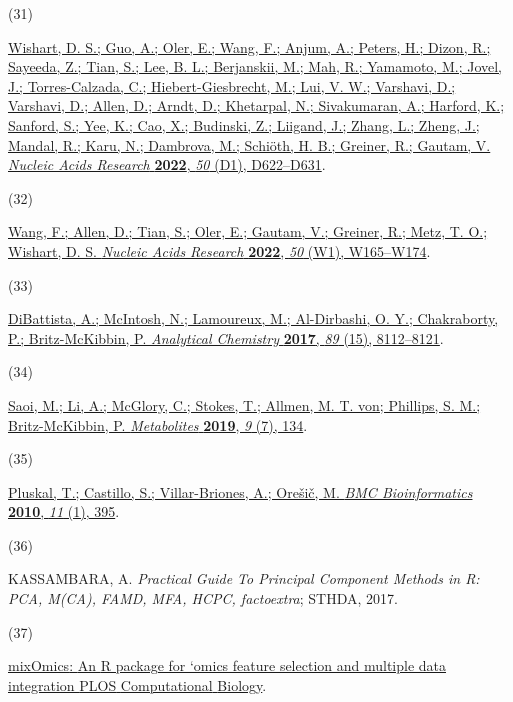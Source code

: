 \documentclass[journal=jacsat,manuscript=article]{achemso}
\newlength{\cslhangindent}
\newlength{\csllabelwidth}
\newenvironment{CSLReferences}[2] %
 {\begin{list}{}{%
  \setlength{\itemindent}{0pt}
  \setlength{\leftmargin}{0pt}
  \setlength{\parsep}{0pt}
  \ifodd #1
   \setlength{\leftmargin}{\cslhangindent}
   \setlength{\itemindent}{-1\cslhangindent}
  \fi
  \setlength{\itemsep}{#2\baselineskip}}}
 {\end{list}}
\newcommand{\CSLLeftMargin}[1]{\parbox[t]{\csllabelwidth}{#1}}
\newcommand{\CSLRightInline}[1]{\parbox[t]{\linewidth - \csllabelwidth}{#1}\break}
\begin{document}
\begin{CSLReferences}{0}{0}
\CSLLeftMargin{(31) }%
\CSLRightInline{\href{https://doi.org/10.1093/nar/gkab1062}{Wishart, D.
S.; Guo, A.; Oler, E.; Wang, F.; Anjum, A.; Peters, H.; Dizon, R.;
Sayeeda, Z.; Tian, S.; Lee, B. L.; Berjanskii, M.; Mah, R.; Yamamoto,
M.; Jovel, J.; Torres-Calzada, C.; Hiebert-Giesbrecht, M.; Lui, V. W.;
Varshavi, D.; Varshavi, D.; Allen, D.; Arndt, D.; Khetarpal, N.;
Sivakumaran, A.; Harford, K.; Sanford, S.; Yee, K.; Cao, X.; Budinski,
Z.; Liigand, J.; Zhang, L.; Zheng, J.; Mandal, R.; Karu, N.; Dambrova,
M.; Schiöth, H. B.; Greiner, R.; Gautam, V. \emph{Nucleic Acids
Research} \textbf{2022}, \emph{50} (D1), D622--D631}.}

\CSLLeftMargin{(32) }%
\CSLRightInline{\href{https://doi.org/10.1093/nar/gkac383}{Wang, F.;
Allen, D.; Tian, S.; Oler, E.; Gautam, V.; Greiner, R.; Metz, T. O.;
Wishart, D. S. \emph{Nucleic Acids Research} \textbf{2022}, \emph{50}
(W1), W165--W174}.}

\CSLLeftMargin{(33) }%
\CSLRightInline{\href{https://doi.org/10.1021/acs.analchem.7b01727}{DiBattista,
A.; McIntosh, N.; Lamoureux, M.; Al-Dirbashi, O. Y.; Chakraborty, P.;
Britz-McKibbin, P. \emph{Analytical Chemistry} \textbf{2017}, \emph{89}
(15), 8112--8121}.}

\CSLLeftMargin{(34) }%
\CSLRightInline{\href{https://doi.org/10.3390/metabo9070134}{Saoi, M.;
Li, A.; McGlory, C.; Stokes, T.; Allmen, M. T. von; Phillips, S. M.;
Britz-McKibbin, P. \emph{Metabolites} \textbf{2019}, \emph{9} (7),
134}.}

\CSLLeftMargin{(35) }%
\CSLRightInline{\href{https://doi.org/10.1186/1471-2105-11-395}{Pluskal,
T.; Castillo, S.; Villar-Briones, A.; Orešič, M. \emph{BMC
Bioinformatics} \textbf{2010}, \emph{11} (1), 395}.}

\CSLLeftMargin{(36) }%
\CSLRightInline{KASSAMBARA, A. \emph{Practical {Guide} {To} {Principal}
{Component} {Methods} in {R}: {PCA}, {M}({CA}), {FAMD}, {MFA}, {HCPC},
factoextra}; STHDA, 2017.}

\CSLLeftMargin{(37) }%
\CSLRightInline{\href{https://journals.plos.org/ploscompbiol/article?id=10.1371/journal.pcbi.1005752}{{mixOmics}:
{An} {R} package for `omics feature selection and multiple data
integration {\textbar} {PLOS} {Computational} {Biology}}.}


\end{CSLReferences}
\end{document}
